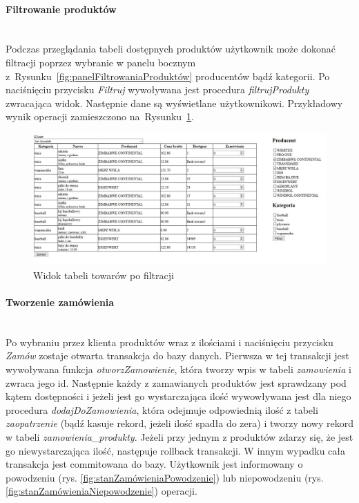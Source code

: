 \documentclass[a4paper, 12pt]{article}
\newcommand{\snippet}[3]{



}
\begin{document}
\paragraph{Filtrowanie produktów} \mbox{}\\
Podczas przeglądania tabeli dostępnych produktów użytkownik może dokonać filtracji poprzez wybranie w panelu bocznym z~Rysunku~\ref{fig:panelFiltrowaniaProduktów} producentów bądź kategorii. Po naciśnięciu przycisku \textit{Filtruj} wywoływana jest procedura \textit{filtrujProdukty} zwracająca widok. Następnie dane są wyświetlane użytkownikowi. Przykładowy wynik operacji zamieszczono na~Rysunku~\ref{fig:rezultatFiltracji}.

\begin{figure}[H]
	\centering
	\includegraphics[width=14cm]{Screeny/Filtrowanie2.JPG}
	\caption[Widok tabeli towarów po filtracji]{Widok tabeli towarów po filtracji}
	\label{fig:rezultatFiltracji}
\end{figure}

\snippet{HTML}{filtrujProdukty.php}{Wywołanie i wyświetlenie wyników procedury \textit{filtrujProdukty}}

\paragraph{Tworzenie zamówienia} \mbox{}\\
Po wybraniu przez klienta produktów wraz z ilościami i naciśnięciu przycisku \textit{Zamów} zostaje otwarta transakcja do bazy danych. Pierwsza w tej transakcji jest wywoływana funkcja \textit{otworzZamowienie}, która tworzy wpis w tabeli \textit{zamowienia} i zwraca jego id. Następnie każdy z zamawianych produktów jest sprawdzany pod kątem dostępności i jeżeli jest go wystarczająca ilość wywowływana jest dla niego procedura \textit{dodajDoZamowienia}, która odejmuje odpowiednią ilość z tabeli \textit{zaopatrzenie} (bądź kasuje rekord, jeżeli ilość spadła do zera) i tworzy nowy rekord w tabeli \textit{zamowienia\_produkty}. Jeżeli przy jednym z produktów zdarzy się, że jest go niewystarczająca ilość, następuje rollback transakcji. W innym wypadku cała transakcja jest commitowana do bazy.
Użytkownik jest informowany o powodzeniu (rys. \ref{fig:stanZamówieniaPowodzenie}) lub niepowodzeniu (rys. \ref{fig:stanZamówieniaNiepowodzenie}) operacji.
\end{document}
